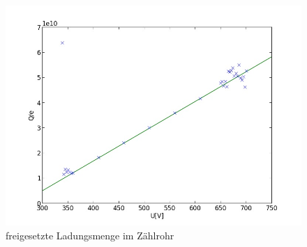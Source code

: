 	\begin{figure}[h]
		\begin{center}
		\includegraphics[scale=0.75]{picD.jpg}
		\caption{freigesetzte Ladungsmenge im Zählrohr}
		\label{picD}
		\end{center}	
	\end{figure}